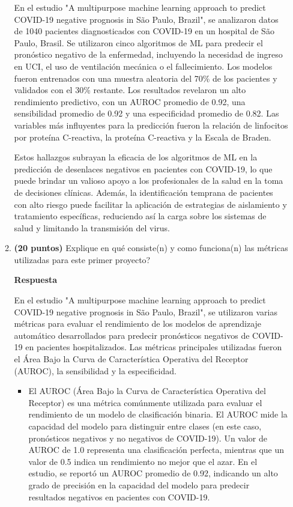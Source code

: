 \documentclass{article}
\begin{document}
\begin{enumerate}
\begin{enumerate}
En el estudio "A multipurpose machine learning approach to predict COVID-19 negative prognosis in São Paulo, Brazil", se analizaron datos de 1040 pacientes diagnosticados con COVID-19 en un hospital de São Paulo, Brasil. Se utilizaron cinco algoritmos de ML para predecir el pronóstico negativo de la enfermedad, incluyendo la necesidad de ingreso en UCI, el uso de ventilación mecánica o el fallecimiento. Los modelos fueron entrenados con una muestra aleatoria del 70\% de los pacientes y validados con el 30\% restante. Los resultados revelaron un alto rendimiento predictivo, con un AUROC promedio de 0.92, una sensibilidad promedio de 0.92 y una especificidad promedio de 0.82. Las variables más influyentes para la predicción fueron la relación de linfocitos por proteína C-reactiva, la proteína C-reactiva y la Escala de Braden.
\vspace{5px}

Estos hallazgos subrayan la eficacia de los algoritmos de ML en la predicción de desenlaces negativos en pacientes con COVID-19, lo que puede brindar un valioso apoyo a los profesionales de la salud en la toma de decisiones clínicas. Además, la identificación temprana de pacientes con alto riesgo puede facilitar la aplicación de estrategias de aislamiento y tratamiento específicas, reduciendo así la carga sobre los sistemas de salud y limitando la transmisión del virus.

\item \textbf{(20 puntos)} Explique en qué consiste(n) y como funciona(n)
las métricas utilizadas para este primer proyecto?
\vspace{5px}
\par \textbf{Respuesta}
\vspace{5px}
\par En el estudio "A multipurpose machine learning approach to predict COVID-19 negative prognosis in São Paulo, Brazil", se utilizaron varias métricas para evaluar el rendimiento de los modelos de aprendizaje automático desarrollados para predecir pronósticos negativos de COVID-19 en pacientes hospitalizados. Las métricas principales utilizadas fueron el Área Bajo la Curva de Característica Operativa del Receptor (AUROC), la sensibilidad y la especificidad.


\begin{itemize}
    \item El AUROC (Área Bajo la Curva de Característica Operativa del Receptor) es una métrica comúnmente utilizada para evaluar el rendimiento de un modelo de clasificación binaria. El AUROC mide la capacidad del modelo para distinguir entre clases (en este caso, pronósticos negativos y no negativos de COVID-19). Un valor de AUROC de 1.0 representa una clasificación perfecta, mientras que un valor de 0.5 indica un rendimiento no mejor que el azar. En el estudio, se reportó un AUROC promedio de 0.92, indicando un alto grado de precisión en la capacidad del modelo para predecir resultados negativos en pacientes con COVID-19.


\end{itemize}
\end{enumerate}
\end{enumerate}
\end{document}
